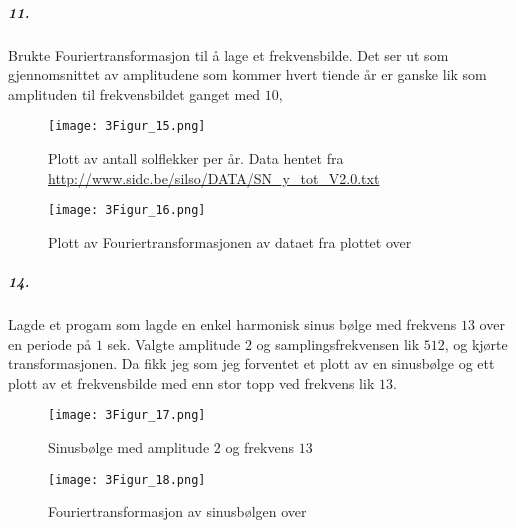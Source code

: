 \documentclass[11pt, A4paper,norsk]{article}
\begin{document}
			\subparagraph{11.}
				\begin{flushleft}
Brukte Fouriertransformasjon til å lage et frekvensbilde. Det ser ut som gjennomsnittet av amplitudene som kommer hvert tiende år er ganske lik som amplituden til frekvensbildet ganget med $10$, 
				\end{flushleft}
				\begin{figure}[H]
\texttt{[image: 3Figur\_15.png]} \\
\caption{Plott av antall solflekker per år. Data hentet fra \url{http://www.sidc.be/silso/DATA/SN_y_tot_V2.0.txt}}
				\end{figure}
				\begin{figure}[H]
\texttt{[image: 3Figur\_16.png]} \\
\caption{Plott av Fouriertransformasjonen av dataet fra plottet over}
				\end{figure}










			\subparagraph{14.}
				\begin{flushleft}
Lagde et progam som lagde en enkel harmonisk sinus bølge med frekvens $13$ over en periode på $1$ sek. Valgte amplitude $2$ og samplingsfrekvensen lik $512$, og kjørte transformasjonen. Da fikk jeg som jeg forventet et plott av en sinusbølge og ett plott av et frekvensbilde med enn stor topp ved frekvens lik $13$.
				\end{flushleft}
				\begin{figure}[H]
\texttt{[image: 3Figur\_17.png]} \\
\caption{Sinusbølge med amplitude $2$ og frekvens $13$}
				\end{figure}
				\begin{figure}[H]
\texttt{[image: 3Figur\_18.png]} \\
\caption{Fouriertransformasjon av sinusbølgen over}
				\end{figure}

\end{document}
